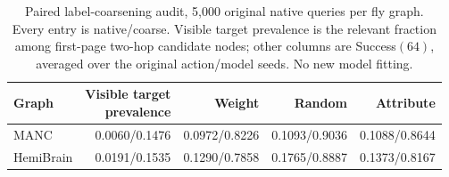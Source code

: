 \begin{table}[h]
\centering\scriptsize
\setlength{\tabcolsep}{3pt}
\caption{Paired label-coarsening audit, 5,000 original native queries per fly graph. Every entry is native/coarse. Visible target prevalence is the relevant fraction among first-page two-hop candidate nodes; other columns are Success$(64)$, averaged over the original action/model seeds. No new model fitting.}
\label{tab:ladder}
\begin{tabular}{lrrrr}
\toprule
Graph & \shortstack{Visible target\\prevalence} & Weight & Random & Attribute \\
\midrule
MANC & 0.0060/0.1476 & 0.0972/0.8226 & 0.1093/0.9036 & 0.1088/0.8644 \\
HemiBrain & 0.0191/0.1535 & 0.1290/0.7858 & 0.1765/0.8887 & 0.1373/0.8167 \\
\bottomrule
\end{tabular}
\end{table}
